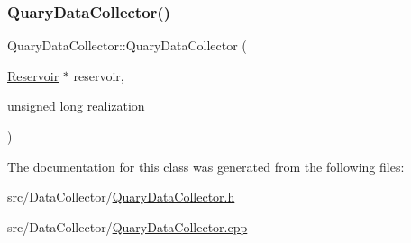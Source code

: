 \subsubsection{\texorpdfstring{Quary\+Data\+Collector()}{QuaryDataCollector()}}
{\footnotesize\ttfamily Quary\+Data\+Collector\+::\+Quary\+Data\+Collector (\begin{DoxyParamCaption}\item[{\mbox{\hyperlink{classReservoir}{Reservoir}} $\ast$}]{reservoir,  }\item[{unsigned long}]{realization }\end{DoxyParamCaption})}



The documentation for this class was generated from the following files\+:\begin{DoxyCompactItemize}
\item 
src/\+Data\+Collector/\mbox{\hyperlink{QuaryDataCollector_8h}{Quary\+Data\+Collector.\+h}}\item 
src/\+Data\+Collector/\mbox{\hyperlink{QuaryDataCollector_8cpp}{Quary\+Data\+Collector.\+cpp}}\end{DoxyCompactItemize}
